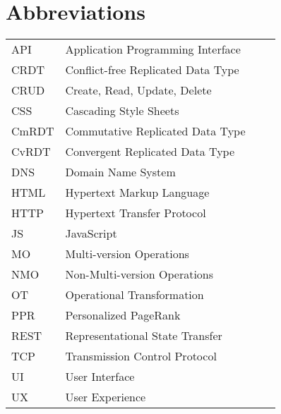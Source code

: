 \chapter*{Abbreviations}


\begin{flushleft}
\begin{tabular}{l p{0.8\linewidth}}
API      & Application Programming Interface\\
CRDT     & Conflict-free Replicated Data Type\\
CRUD     & Create, Read, Update, Delete\\
CSS      & Cascading Style Sheets\\
CmRDT    & Commutative Replicated Data Type\\
CvRDT    & Convergent Replicated Data Type\\
DNS      & Domain Name System\\
HTML     & Hypertext Markup Language\\
HTTP     & Hypertext Transfer Protocol\\
JS       & JavaScript\\
MO       & Multi-version Operations\\
NMO      & Non-Multi-version Operations\\
OT       & Operational Transformation\\
PPR      & Personalized PageRank \\
REST     & Representational State Transfer\\
TCP      & Transmission Control Protocol\\
UI       & User Interface\\
UX       & User Experience\\
\end{tabular}
\end{flushleft}

